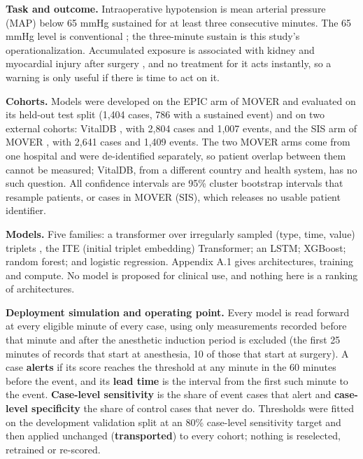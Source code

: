 \textbf{Task and outcome.} Intraoperative hypotension is mean arterial pressure (MAP) below 65 mmHg
sustained for at least three consecutive minutes. The 65 mmHg level is conventional
\citep{salmasi2017ioh, sessler2019poqi}; the three-minute sustain is this study's operationalization.
Accumulated exposure is associated with kidney and myocardial injury after surgery
\citep{walsh2013map, salmasi2017ioh, wesselink2018ioh}, and no treatment for it acts instantly,
so a warning is only useful if there is time to act on it.

\textbf{Cohorts.} Models were developed on the EPIC arm of MOVER and evaluated on its held-out test
split (1,404 cases, 786 with a sustained event) and on two external cohorts: VitalDB
\citep{lee2022vitaldb, lee2022vitaldbdataset}, with 2,804 cases and 1,007 events, and the SIS arm of
MOVER \citep{samad2023mover, samad2023moverdataset}, with 2,641 cases and 1,409 events. The two MOVER
arms come from one hospital and were de-identified separately, so patient overlap between them
cannot be measured; VitalDB, from a different country and health system, has no such question.
All confidence intervals are 95\% cluster bootstrap intervals that resample patients, or cases in
MOVER (SIS), which releases no usable patient identifier.

\textbf{Models.} Five families: a transformer over irregularly sampled (type, time, value) triplets
\citep{tipirneni2022strats}, the ITE (initial triplet embedding) Transformer; an LSTM; XGBoost; random
forest; and logistic regression. Appendix A.1 gives architectures, training and compute. No model
is proposed for clinical use, and nothing here is a ranking of architectures.

\textbf{Deployment simulation and operating point.} Every model is read forward at every eligible
minute of every case, using only measurements recorded before that minute and after the
anesthetic induction period is excluded (the first 25 minutes of records that start at anesthesia,
10 of those that start at surgery). A case \textbf{alerts} if its score reaches the threshold at any
minute in the 60 minutes before the event, and its \textbf{lead time} is the interval from the first
such minute to the event. \textbf{Case-level sensitivity} is the share of event cases that alert and
\textbf{case-level specificity} the share of control cases that never do. Thresholds were fitted on
the development validation split at an 80\% case-level sensitivity target and then applied
unchanged (\textbf{transported}) to every cohort; nothing is reselected, retrained or re-scored.

